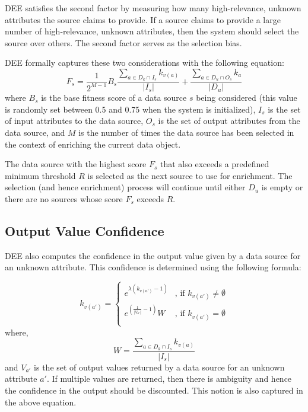 \documentclass[letterpaper]{article}
\begin{document}
DEE satisfies the second factor by measuring how many high-relevance, unknown attributes the source claims 
to provide. If a source claims to provide a large number of high-relevance, unknown attributes, then the 
system should select the source over others. The second factor serves as the selection bias. 

DEE formally captures these two considerations with the following equation:
\begin{equation}
    F_s = \frac{1}{2^{M-1}}B_s \frac{\displaystyle\sum\limits_{a \in D_k \cap I_s} k_{v(a)}}{|I_s|} 
    	+ \frac{\displaystyle\sum\limits_{a \in D_u \cap O_s} k_{a}}{|D_u|}
\end{equation}
where $B_s$ is the base fitness score of a data source $s$ being considered (this value is randomly set between 
0.5 and 0.75 when the system is initialized), $I_s$ is the set of input attributes to the data source, $O_s$ is 
the set of output attributes from the data source, and $M$ is the number of times the data source has been 
selected in the context of enriching the current data object.

The data source with the highest score $F_s$ that also exceeds a predefined minimum threshold $R$ is selected
as the next source to use for enrichment. The selection (and hence enrichment) process will continue until
either $D_u$ is empty or there are no sources whose score $F_s$ exceeds $R$.


\subsection{Output Value Confidence} 

DEE also computes the confidence in the output value given by a data source for an unknown attribute. 
This confidence is determined using the following formula: 

\begin{equation}
 \label{_output_confidence}
k_{v(a')} = \left\lbrace 
		\begin{array}{ll}
			e^{\lambda(k_{v(a')} - 1)} 						& \mbox{, if } k_{v(a')} \neq \emptyset \\
			e^{ \left( \frac{1}{|V_{a'}|} - 1 \right) } W \nonumber  	& \mbox{, if } k_{v(a')} = \emptyset \\
		\end{array}
		\right.
\end{equation}
where,  
\begin{equation}
	W = \frac{\displaystyle\sum\limits_{a \in D_k \cap I_s} k_{v(a)} }{|I_s|}
\end{equation}
and $V_{a'}$ is the set of output values returned by a data source for an unknown attribute $a'$. If 
multiple values are returned, then there is ambiguity and hence the confidence in the output should 
be discounted. This notion is also captured in the above equation.
\end{document}
